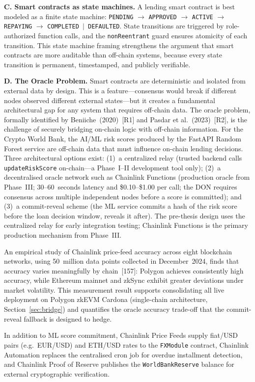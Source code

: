 \documentclass[12pt,a4paper]{report}
\begin{document}
\textbf{C. Smart contracts as state machines.}
A lending smart contract is best modeled as a finite state machine: \texttt{PENDING} $\to$ \texttt{APPROVED} $\to$ \texttt{ACTIVE} $\to$ \texttt{REPAYING} $\to$ \texttt{COMPLETED $|$ DEFAULTED}. State transitions are triggered by role-authorized function calls, and the \texttt{nonReentrant} guard ensures atomicity of each transition. This state machine framing strengthens the argument that smart contracts are more auditable than off-chain systems, because every state transition is permanent, timestamped, and publicly verifiable.

\textbf{D. The Oracle Problem.}
Smart contracts are deterministic and isolated from external data by design. This is a feature---consensus would break if different nodes observed different external states---but it creates a fundamental architectural gap for any system that requires off-chain data. The oracle problem, formally identified by Beniiche~(2020)~[R1] and Pasdar et al.~(2023)~[R2], is the challenge of securely bridging on-chain logic with off-chain information. For the Crypto World Bank, the AI/ML risk scores produced by the FastAPI Random Forest service are off-chain data that must influence on-chain lending decisions. Three architectural options exist: (1)~a centralized relay (trusted backend calls \texttt{updateRiskScore} on-chain---a Phase~I--II development tool only); (2)~a decentralised oracle network such as Chainlink Functions (production oracle from Phase~III; 30--60~seconds latency and \$0.10--\$1.00 per call; the DON requires consensus across multiple independent nodes before a score is committed); and (3)~a commit-reveal scheme (the ML service commits a hash of the risk score before the loan decision window, reveals it after). The pre-thesis design uses the centralized relay for early integration testing; Chainlink Functions is the primary production mechanism from Phase~III.

An empirical study of Chainlink price-feed accuracy across eight blockchain networks, using 50~million data points collected in December~2024, finds that accuracy varies meaningfully by chain~[157]: Polygon achieves consistently high accuracy, while Ethereum mainnet and zkSync exhibit greater deviations under market volatility.
This measurement result supports consolidating all live deployment on Polygon zkEVM Cardona (single-chain architecture, Section~\ref{sec:bridge}) and quantifies the oracle accuracy trade-off that the commit-reveal fallback is designed to hedge.

In addition to ML score commitment, Chainlink Price Feeds supply fiat/USD pairs (e.g.\ EUR/USD) and ETH/USD rates to the \texttt{FXModule} contract, Chainlink Automation replaces the centralised cron job for overdue installment detection, and Chainlink Proof of Reserve publishes the \texttt{WorldBankReserve} balance for external cryptographic verification.
\end{document}
